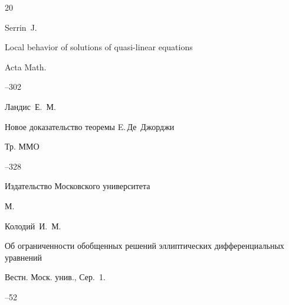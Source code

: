 \begin{thebibliography}{20}

\by  Serrin~J.

\paper Local behavior of solutions of quasi-linear equations

\jour Acta Math.




--302







\by Ландис~Е.~М.

\paper Новое доказательство теоремы E.\,Де~Джорджи

\serial Тр. ММО



--328

\publ Издательство Московского университета

\publaddr М.









\by Колодий~И.~М.

\paper Об ограниченности обобщенных решений эллиптических дифференциальных уравнений

\jour Вестн. Моск. унив., Сер.~1.



--52











\end{thebibliography}

